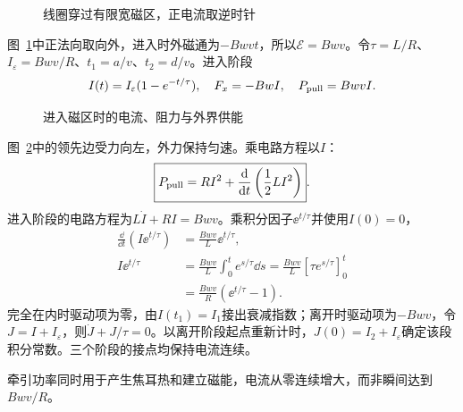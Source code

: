 \begin{figure}[H]\centering
{}
\caption{线圈穿过有限宽磁区，正电流取逆时针}\label{fig:i4-e8-q}
\end{figure}
\begin{solution}
图~\ref{fig:i4-e8-q}中正法向取向外，进入时外磁通为$-Bwvt$，所以$\mathcal E=Bwv$。令$\tau=L/R$、$I_\varepsilon=Bwv/R$、$t_1=a/v$、$t_2=d/v$。进入阶段
\[
I(t)=I_\varepsilon(1-e^{-t/\tau}),\quad
F_x=-BwI,\quad P_{\rm pull}=BwvI.
\]

\begin{figure}[H]\centering
{}
\caption{进入磁区时的电流、阻力与外界供能}\label{fig:i4-e8-s}
\end{figure}

图~\ref{fig:i4-e8-s}中的领先边受力向左，外力保持匀速。乘电路方程以$I$：
\[
\boxed{P_{\rm pull}=RI^2+\frac{\mathop{}\!\mathrm d}{\mathop{}\!\mathrm d t}\left(\frac12LI^2\right)}.
\]
进入阶段的电路方程为$L\dot I+RI=Bwv$。乘积分因子$\ee^{t/\tau}$并使用$I(0)=0$，
\[\begin{aligned}
\frac{\dd}{\dd t}(I\ee^{t/\tau})&=\frac{Bwv}{L}\ee^{t/\tau},\\
I\ee^{t/\tau}&=\frac{Bwv}{L}\int_0^te^{s/\tau}\dd s
=\frac{Bwv}{L}[\tau e^{s/\tau}]_0^t\\
&=\frac{Bwv}{R}(\ee^{t/\tau}-1).
\end{aligned}\]
完全在内时驱动项为零，由$I(t_1)=I_1$接出衰减指数；离开时驱动项为$-Bwv$，令$J=I+I_\varepsilon$，则$\dot J+J/\tau=0$。以离开阶段起点重新计时，$J(0)=I_2+I_\varepsilon$确定该段积分常数。三个阶段的接点均保持电流连续。

牵引功率同时用于产生焦耳热和建立磁能，电流从零连续增大，而非瞬间达到$Bwv/R$。


\end{solution}
